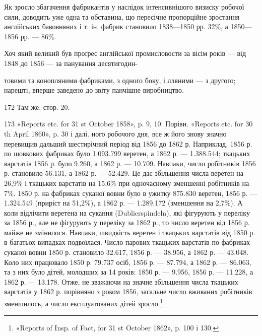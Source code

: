 Як зросло збагачення фабрикантів у наслідок інтенсивнішого
визиску робочої сили, доводить уже одна та обставина, що пересічне
пропорційне зростання англійських бавовняних і т. ін.
фабрик становило 1838—1850 рр. 32\%, а 1850—1856 рр. — 86\%.

Хоч який великий був проґрес англійської промисловости
за вісім років — від 1848 до 1856 — за панування десятигодин-

товими та конопляними фабриками, з одного боку, і лляними — з другого;
нарешті, вперше заведено до звіту панчішне виробництво.

172 Там же, стор. 20.

173 «Reports etc. for 31 st October 1858», p. 9, 10. Порівн. «Reports
etc. for 30 th April 1860», p. 30 і далі.
ного робочого дня, все ж його знову значно перевищив дальший
шестирічний період від 1856 до 1862 р. Наприклад, 1856 р. по
шовкових фабриках було 1.093.799 веретен, а 1862 р. — 1.388.544;
ткацьких варстатів 1856 р. було 9.260, а 1862 р. — 10.709. Навпаки,
число робітників 1856 р. становило 56.131, а 1862 р. — 52.429.
Це дає збільшення числа веретен на 26,9\% і ткацьких варстатів
на 15,6\% при одночасному зменшенні робітників на 7\%. 1850 р. на
фабриках суканої вовни було в ужитку 875.830 веретен, 1856 р. —
1.324.549 (приріст на 51,2\%), а 1862 р. — 1.289.172 (зменшення
на 2,7\%). А коли відлічити веретена на сукання (Dublierspindeln),
які фігурують у переліку за 1856 р., але не фігурують у переліку
за 1862 р., то число веретен від 1856 р. майже не змінилося. Навпаки,
швидкість веретен і ткацьких варстатів від 1850 р. в
багатьох випадках подвоїлася. Число парових ткацьких варстатів
по фабриках суканої вовни 1850 р. становило 32.617,
1856 р. — 38.956, а 1862 р. — 43.048. Коло них працювало 1850 р.
79.737 осіб, 1856 р. — 87.794, а 1862 р. — 86.063, та з них було
дітей, молодших за 14 років: 1850 р. — 9.956, 1856 р. — 11.228,
а 1862 р. — 13.178. Отже, не зважаючи на значне збільшення
числа ткацьких варстатів у 1862 р. порівняно з роком 1856, загальне
число вживаних робітників зменшилось, а число експлуатованих
дітей зросло.\footnote{
«Reports of Insp. of Fact, for 31 st October 1862», p. 100 і 130.
}

